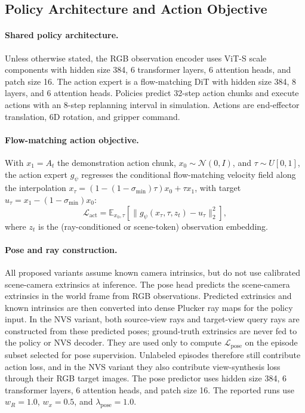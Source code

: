 \subsection{Policy Architecture and Action Objective}
\label{sec:appendix-policy-architecture}

\paragraph{Shared policy architecture.}
Unless otherwise stated, the RGB observation encoder uses ViT-S scale
components with hidden size 384, 6 transformer layers, 6 attention heads, and
patch size 16.  The action expert is a flow-matching DiT with hidden size 384,
8 layers, and 6 attention heads.  Policies predict 32-step action chunks and
execute actions with an 8-step replanning interval in simulation.  Actions are
end-effector translation, 6D rotation, and gripper command.

\paragraph{Flow-matching action objective.}
With \(x_1=A_t\) the demonstration action chunk, \(x_0\sim\mathcal{N}(0,I)\), and
\(\tau\sim U[0,1]\), the action expert \(g_\psi\) regresses the conditional
flow-matching velocity field along the interpolation
\(x_\tau = (1-(1-\sigma_{\min})\tau)x_0+\tau x_1\), with target
\(u_\tau = x_1-(1-\sigma_{\min})x_0\):
\begin{equation}
\mathcal{L}_{\text{act}} =
\mathbb{E}_{x_0,\tau}\left[\|g_\psi(x_\tau,\tau,z_t)-u_\tau\|_2^2\right],
\end{equation}
where \(z_t\) is the (ray-conditioned or scene-token) observation embedding.

\paragraph{Pose and ray construction.}
All proposed variants assume known camera intrinsics, but do not use calibrated scene-camera extrinsics at inference.
The pose head predicts the scene-camera extrinsics in the world
frame from RGB observations.  Predicted extrinsics and known intrinsics are then
converted into dense Plucker ray maps for the policy input.  In the NVS variant,
both source-view rays and target-view query rays are constructed from these
predicted poses; ground-truth extrinsics are never fed to the policy or NVS
decoder.  They are used only to compute \(\mathcal{L}_{\text{pose}}\) on the
episode subset selected for pose supervision.  Unlabeled episodes therefore
still contribute action loss, and in the NVS variant they also contribute
view-synthesis loss through their RGB target images.  The pose predictor uses
hidden size 384, 6 transformer layers, 6 attention heads, and patch size 16.
The reported runs use \(w_R=1.0\), \(w_x=0.5\), and
\(\lambda_{\text{pose}}=1.0\).

